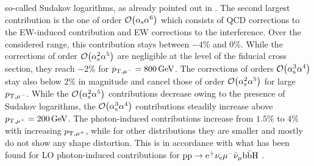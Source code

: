 \documentclass[a4article,11pt]{article}
\begin{document}
so-called Sudakov logarithms, as already pointed out in
.  The second largest contribution is the
one of order $\mathcal{O}{\left(\alpha_\text{s}\alpha^{6}\right)}$ which
consists of QCD corrections to the EW-induced contribution and EW
corrections to the interference.  
Over the considered range, this contribution stays between $-4\%$ and
$0\%$.  While the corrections of order
$\mathcal{O}{\left(\alpha_\text{s}^{2}\alpha^{5}\right)}$ are negligible at
the level of the fiducial cross section, they reach $-2\%$ for
$p_{{\mathrm{T}},\mu^-}=800\,\text{GeV}$.  The corrections of orders
$\mathcal{O}{\left(\alpha_\text{s}^{3}\alpha^{4}\right)}$ stay also below
$2\%$ in magnitude and cancel those of order
$\mathcal{O}{\left(\alpha_\text{s}^{2}\alpha^{5}\right)}$ for large
$p_{{\mathrm{T}},\mu^-}$.
While the $\mathcal{O}{\left(\alpha_\text{s}^{2}\alpha^{5}\right)}$
contributions decrease owing to the presence of Sudakov logarithms,
the $\mathcal{O}{\left(\alpha_\text{s}^{3}\alpha^{4}\right)}$ contributions
steadily increase above $p_{{\mathrm{T}},\mu^+}=200\,\text{GeV}$.  The photon-induced
contributions increase from $1.5\%$ to $4\%$ with increasing
$p_{{\mathrm{T}},\mu^+}$, while for other distributions they are smaller and
mostly do not show any shape distortion.  This is in accordance with
what has been found for LO photon-induced contributions for $\text{p} \text{p}
\to \text{e}^+ \nu_{\text{e}} \mu^- \bar{\nu}_\mu \text{b} \bar{\text{b}} \text{H}$
\cite{Denner:2016wet}.
\end{document}
